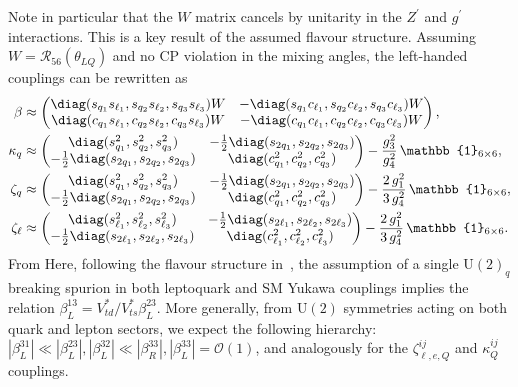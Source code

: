 Note in particular that the $W$ matrix cancels by unitarity in the $Z^\prime$ and $g^\prime$ interactions. This is a key result of the assumed flavour structure. Assuming $W=\mathcal{R}_{56}(\theta_{LQ})$ and no CP violation in the mixing angles, the left-handed couplings can be rewritten as
\begin{align}\label{eq:Beta}
\beta &\approx
\begin{pmatrix}
  \diag( s_{q_1}s_{\ell_1}, s_{q_2}s_{\ell_2}, s_{q_3}s_{\ell_3} ) W& -\diag( s_{q_1}c_{\ell_1}, s_{q_2}c_{\ell_2}, s_{q_3}c_{\ell_3} ) W \\
  \diag( c_{q_1}s_{\ell_1}, c_{q_2}s_{\ell_2}, c_{q_3}s_{\ell_3} ) W & -\diag( c_{q_1}c_{\ell_1}, c_{q_2}c_{\ell_2}, c_{q_3}c_{\ell_3} ) W
\end{pmatrix},
\\
\kappa_q &\approx
\begin{pmatrix}
  \diag( s_{q_1}^2, s_{q_2}^2, s_{q_3}^2 ) & -\frac{1}{2}\diag( s_{2q_1}, s_{2q_2}, s_{2q_3} ) \\
  -\frac{1}{2}\diag( s_{2q_1}, s_{2q_2}, s_{2q_3} )  & \diag( c_{q_1}^2, c_{q_2}^2, c_{q_3}^2 )
\end{pmatrix}
-\frac{g_3^2}{g_4^2}\,\mathbb{1}_{6\times6},
\\
\zeta_q &\approx
\begin{pmatrix}
  \diag( s_{q_1}^2, s_{q_2}^2, s_{q_3}^2 ) & -\frac{1}{2}\diag( s_{2q_1}, s_{2q_2}, s_{2q_3} ) \\
  -\frac{1}{2}\diag( s_{2q_1}, s_{2q_2}, s_{2q_3} )  & \diag( c_{q_1}^2, c_{q_2}^2, c_{q_3}^2 )
\end{pmatrix}
-\frac{2\,g_1^2}{3\,g_4^2}\,\mathbb{1}_{6\times6},
\\
\zeta_\ell &\approx
\begin{pmatrix}
  \diag( s_{\ell_1}^2, s_{\ell_2}^2, s_{\ell_3}^2 ) & -\frac{1}{2}\diag( s_{2\ell_1}, s_{2\ell_2}, s_{2\ell_3} ) \\
  -\frac{1}{2}\diag( s_{2\ell_1}, s_{2\ell_2}, s_{2\ell_3} )  & \diag( c_{\ell_1}^2, c_{\ell_2}^2, c_{\ell_3}^2 )
\end{pmatrix}
-\frac{2\,g_1^2}{3\,g_4^2}\,\mathbb{1}_{6\times6}.
\label{eq:LLmbE}
\end{align}
From Here, following the flavour structure in~\cite{Buttazzo:2017ixm}, the assumption of a single $\mathrm{U}(2)_q$ breaking spurion in both leptoquark and SM Yukawa couplings implies the relation $\beta_L^{13}=V_{t d}^* / V_{t s}^* \beta_L^{23}$. More generally, from $\mathrm{U}(2)$ symmetries acting on both quark and lepton sectors, we expect the following hierarchy: $\left|\beta_L^{31}\right| \ll\left|\beta_L^{23}\right|,\left|\beta_L^{32}\right| \ll\left|\beta_R^{33}\right|,\left|\beta_L^{33}\right|=\mathcal{O}(1)$, and analogously for the $\zeta_{\ell, e, Q}^{i j}$ and $\kappa_Q^{i j}$ couplings. 


